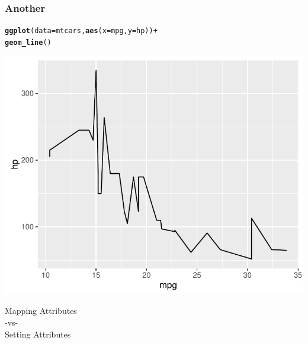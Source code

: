 \documentclass[12pt]{beamer}\usepackage[]{graphicx}\usepackage[]{color}
\makeatletter
\newcommand{\hlopt}[1]{\textcolor[rgb]{0,0,0}{#1}}%
\newcommand{\hlstd}[1]{\textcolor[rgb]{0.345,0.345,0.345}{#1}}%
\newcommand{\hlkwc}[1]{\textcolor[rgb]{0.333,0.667,0.333}{#1}}%
\newcommand{\hlkwd}[1]{\textcolor[rgb]{0.737,0.353,0.396}{\textbf{#1}}}%
\newenvironment{kframe}{%
 \def\at@end@of@kframe{}%
 \ifinner\ifhmode%
  \def\at@end@of@kframe{\end{minipage}}%
  \begin{minipage}{\columnwidth}%
 \fi\fi%
 \def\FrameCommand##1{\hskip\@totalleftmargin \hskip-\fboxsep
 \colorbox{shadecolor}{##1}\hskip-\fboxsep
     \hskip-\linewidth \hskip-\@totalleftmargin \hskip\columnwidth}%
 \MakeFramed {\advance\hsize-\width
   \@totalleftmargin\z@ \linewidth\hsize
   \@setminipage}}%
 {\par\unskip\endMakeFramed%
 \at@end@of@kframe}
\newenvironment{knitrout}{}{} %
\makeatother
\begin{document}
\begin{frame}[fragile]
\frametitle{Another }
\begin{knitrout}\scriptsize
{}\color{fgcolor}\begin{kframe}
\begin{alltt}
\hlkwd{ggplot}\hlstd{(}\hlkwc{data} \hlstd{= mtcars,} \hlkwd{aes}\hlstd{(}\hlkwc{x} \hlstd{= mpg,} \hlkwc{y} \hlstd{= hp))} \hlopt{+}
  \hlkwd{geom_line}\hlstd{()}
\end{alltt}
\end{kframe}

{\centering \includegraphics[width=.7\linewidth,height=.6\linewidth]{figure/unnamed-chunk-14-1} 

}



\end{knitrout}
\end{frame}


\begin{frame}
\begin{center}
\Huge{{\hilit Mapping Attributes \\ 
-vs- \\
Setting Attributes}}
\end{center}
\end{frame}

\end{document}

